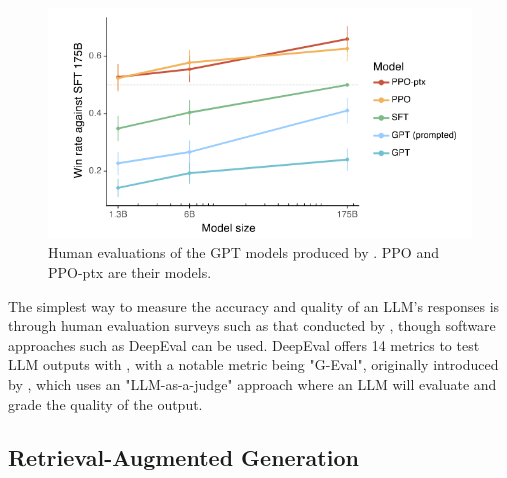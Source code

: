 \documentclass[12pt]{report}
\begin{document}

    \begin{figure}[H] 
        \centering
        \includegraphics[width=.85\linewidth]{ouyangLLMPreference.png}
        \caption{Human evaluations of the GPT models produced by \textcite{ouyang_training_2022}. PPO and PPO-ptx are their models.}
        \label{fig:LLMPref}
    \end{figure}

    The simplest way to measure the accuracy and quality of an LLM's responses is through human evaluation surveys such as that conducted by \textcite{ouyang_training_2022}, though
    software approaches such as DeepEval can be used. DeepEval offers 14 metrics to test LLM outputs with \autocite{deepeval_introduction_2024},
    with a notable metric being "G-Eval", originally introduced by \textcite{liu_g-eval_2023}, which uses an "LLM-as-a-judge" approach where an LLM will evaluate
    and grade the quality of the output.


    \subsection{Retrieval-Augmented Generation}
    
\end{document}
